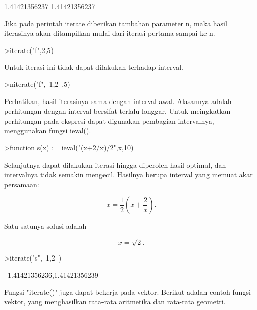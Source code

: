 \documentclass[a4paper,10pt]{article}
\begin{document}
\begin{eulernotebook}
\begin{eulercomment}
\begin{eulercomment}
\begin{eulercomment}
\begin{eulercomment}
\begin{eulerprompt}
\end{eulerprompt}
\begin{euleroutput}
  1.41421356237
  1.41421356237
\end{euleroutput}
\begin{eulercomment}
Jika pada perintah iterate diberikan tambahan parameter n, maka hasil iterasinya akan
ditampilkan mulai dari iterasi pertama sampai ke-n.
\end{eulercomment}
\begin{eulerprompt}
>iterate("f",2,5)
\end{eulerprompt}
\begin{euleroutput}
  [2,  1.5,  1.41667,  1.41422,  1.41421,  1.41421]
\end{euleroutput}
\begin{eulercomment}
Untuk iterasi ini tidak dapat dilakukan terhadap interval.
\end{eulercomment}
\begin{eulerprompt}
>niterate("f",~1,2~,5)
\end{eulerprompt}
\begin{euleroutput}
  [ ~1,2~,  ~1,2~,  ~1,2~,  ~1,2~,  ~1,2~,  ~1,2~ ]
\end{euleroutput}
\begin{eulercomment}
Perhatikan, hasil iterasinya sama dengan interval awal. Alasannya adalah perhitungan dengan
interval bersifat terlalu longgar. Untuk meingkatkan perhitungan pada ekspresi dapat
digunakan pembagian intervalnya, menggunakan fungsi ieval().
\end{eulercomment}
\begin{eulerprompt}
>function s(x) := ieval("(x+2/x)/2",x,10)
\end{eulerprompt}
\begin{eulercomment}
Selanjutnya dapat dilakukan iterasi hingga diperoleh hasil optimal, dan intervalnya tidak
semakin mengecil. Hasilnya berupa interval yang memuat akar persamaan:

\end{eulercomment}
\begin{eulerformula}
\[
x = \frac{1}{2} \left( x + \frac{2}{x} \right).
\]
\end{eulerformula}
\begin{eulercomment}
Satu-satunya solusi adalah\\
\end{eulercomment}
\begin{eulerformula}
\[
x = \sqrt2.
\]
\end{eulerformula}
\begin{eulerprompt}
>iterate("s",~1,2~)
\end{eulerprompt}
\begin{euleroutput}
  ~1.41421356236,1.41421356239~
\end{euleroutput}
\begin{eulercomment}
Fungsi "iterate()" juga dapat bekerja pada vektor. Berikut adalah contoh fungsi vektor, yang
menghasilkan rata-rata aritmetika dan rata-rata geometri.


\end{eulercomment}
\end{eulercomment}
\end{eulercomment}
\end{eulercomment}
\end{eulercomment}
\end{eulernotebook}
\end{document}
